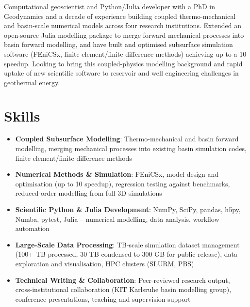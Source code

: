 \documentclass[11pt,a4paper,sans]{moderncv}
\begin{document}
\makecvtitle


\vspace{6pt}
\small{Computational geoscientist and Python/Julia developer with a PhD in Geodynamics and a decade of experience building coupled thermo-mechanical and basin-scale numerical models across four research institutions. Extended an open-source Julia modelling package to merge forward mechanical processes into basin forward modelling, and have built and optimised subsurface simulation software (FEniCSx, finite element/finite difference methods) achieving up to a 10\texttimes{} speedup. Looking to bring this coupled-physics modelling background and rapid uptake of new scientific software to reservoir and well engineering challenges in geothermal energy.}


\section{Skills}
\vspace{1pt}
\begin{itemize}

\item \textbf{Coupled Subsurface Modelling}: Thermo-mechanical and basin forward modelling, merging mechanical processes into existing basin simulation codes, finite element/finite difference methods

\item \textbf{Numerical Methods \& Simulation}: FEniCSx, model design and optimisation (up to 10\texttimes{} speedup), regression testing against benchmarks, reduced-order modelling from full 3D simulations

\item \textbf{Scientific Python \& Julia Development}: NumPy, SciPy, pandas, h5py, Numba, pytest, Julia -- numerical modelling, data analysis, workflow automation

\item \textbf{Large-Scale Data Processing}: TB-scale simulation dataset management (100+ TB processed, 30 TB condensed to 300 GB for public release), data exploration and visualisation, HPC clusters (SLURM, PBS)

\item \textbf{Technical Writing \& Collaboration}: Peer-reviewed research output, cross-institutional collaboration (KIT Karlsruhe basin modelling group), conference presentations, teaching and supervision support

\end{itemize}
\end{document}
